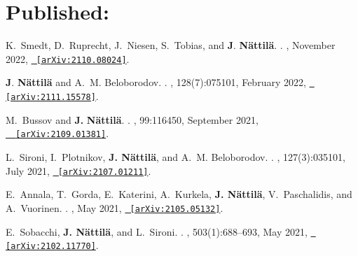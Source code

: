 \documentclass[letterpaper, onecolumn, 11pt]{article}
\begin{document}
\section*{Published:}
\vspace{-1cm}

\begin{thebibliography}{10}

K.~{Smedt}, D.~{Ruprecht}, J.~{Niesen}, S.~{Tobias}, and \textbf{J}.
  {\textbf{N{\"a}ttil{\"a}}}.
.
, November 2022,
  \href{http://arxiv.org/abs/2110.08024}{\nolinkurl{ [arXiv:2110.08024]}}.

\textbf{J}. \textbf{N{\"a}ttil{\"a}} and A.~M. {Beloborodov}.
.
\newblock {\em \prl}, 128(7):075101, February 2022,
  \href{http://arxiv.org/abs/2111.15578}{\nolinkurl{ [arXiv:2111.15578]}}.


M.~{Bussov} and \textbf{J.} {\textbf{N{\"a}ttil{\"a}}}.
.
, 99:116450, September
  2021, \href{http://arxiv.org/abs/2109.01381}{\nolinkurl{
  [arXiv:2109.01381]}}.

L.~{Sironi}, I.~{Plotnikov}, \textbf{J. {N{\"a}ttil{\"a}}}, and A.~M.
  {Beloborodov}.
.
\newblock {\em \prl}, 127(3):035101, July 2021,
  \href{http://arxiv.org/abs/2107.01211}{\nolinkurl{ [arXiv:2107.01211]}}.

E.~{Annala}, T.~{Gorda}, E.~{Katerini}, A.~{Kurkela}, \textbf{J.
  {N{\"a}ttil{\"a}}}, V.~{Paschalidis}, and A.~{Vuorinen}.
.
, May 2021,
  \href{http://arxiv.org/abs/2105.05132}{\nolinkurl{ [arXiv:2105.05132]}}.

E.~{Sobacchi}, \textbf{J. {N{\"a}ttil{\"a}}}, and L.~{Sironi}.
.
\newblock {\em \mnras}, 503(1):688--693, May 2021,
  \href{http://arxiv.org/abs/2102.11770}{\nolinkurl{ [arXiv:2102.11770]}}.


\end{thebibliography}
\end{document}
